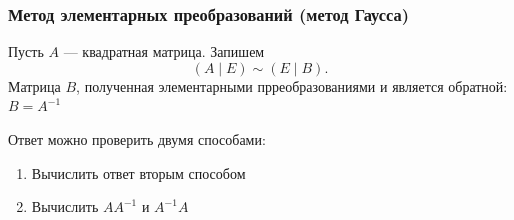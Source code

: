 \documentclass[12pt, a4paper]{article}
\begin{document}
    \subsubsection{Метод элементарных преобразований (метод Гаусса)}
    Пусть \( A \) --- квадратная матрица. Запишем \[
        (A \mid E) \sim (E \mid B).
    \]Матрица \( B \), полученная элементарными прреобразованиями и является обратной: \( B = A^{-1} \)
    \begin{rem}
        Ответ можно проверить двумя способами: \begin{enumerate}
            \item Вычислить ответ вторым способом
            \item Вычислить \( A A^{-1} \) и \( A^{-1}A \)
        \end{enumerate}
    \end{rem}
\end{document}
